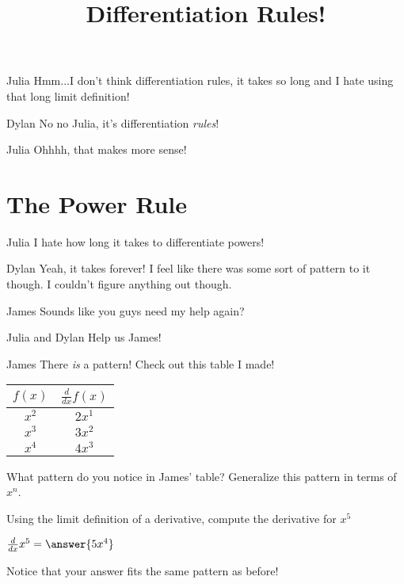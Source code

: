 \documentclass{ximera}
\title{Differentiation Rules!}
\begin{document}
\maketitle
\begin{dialogue}
\item[Julia] Hmm...I don't think differentiation rules, it takes so long and I hate using that long limit definition!
\item[Dylan] No no Julia, it's differentiation \textit{rules}!
\item[Julia] Ohhhh, that makes more sense!

\end{dialogue}
\section{The Power Rule}
\begin{dialogue}
\item[Julia] I hate how long it takes to differentiate powers!
\item[Dylan] Yeah, it takes forever! I feel like there was some sort of pattern to it though. I couldn't figure anything out though.
\item[James] Sounds like you guys need my help again?
\item[Julia and Dylan] Help us James!
\item[James] There \textit{is} a pattern! Check out this table I made!
\end{dialogue}
\begin{center}
\begin{tabular}{c|c}
$f(x)$ & $\frac{d}{dx}f(x)$ \\
\hline
$x^2$ & $2x^1$ \\
$x^3$ & $3x^2$ \\
$x^4$ & $4x^3$
\end{tabular}
\end{center}
\begin{question}
What pattern do you notice in James' table? Generalize this pattern in terms of $x^n$.

\begin{multipleChoice}
\end{multipleChoice}
\end{question}

\begin{question}
Using the limit definition of a derivative, compute the derivative for $x^5$

$\frac{d}{dx} x^5 =  \answer{5x^4}$

Notice that your answer fits the same pattern as before!
\end{question}
\end{document}
